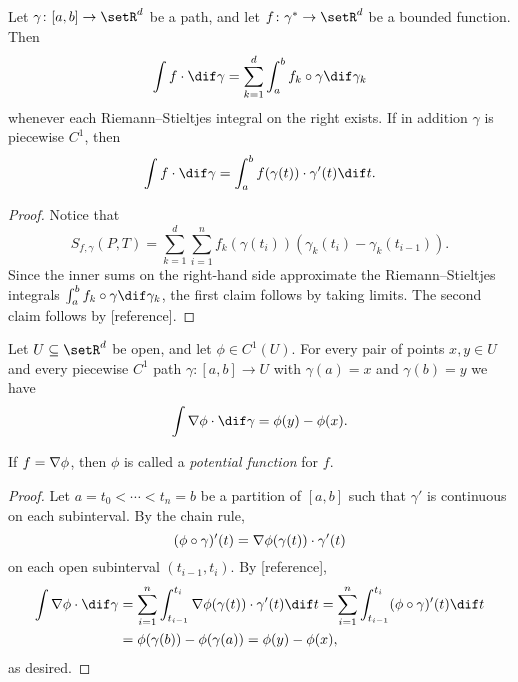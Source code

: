 \documentclass[article, a4paper, 11pt, oneside]{memoir}
\numberwithin{equation}{chapter}
\begin{document}
\begin{proposition}
	Let $\gamma \colon [a,b] \to \setR^d$ be a path, and let $f \colon \gamma^* \to \setR^d$ be a bounded function. Then
	\begin{equation*}
		\int f \cdot \dif\gamma
			= \sum_{k=1}^d \int_a^b f_k \circ \gamma \dif\gamma_k
	\end{equation*}
	whenever each Riemann--Stieltjes integral on the right exists. If in addition $\gamma$ is piecewise $C^1$, then
	\begin{equation*}
		\int f \cdot \dif\gamma
			= \int_a^b f(\gamma(t)) \cdot \gamma'(t) \dif t.
	\end{equation*}
\end{proposition}

\begin{proof}
	Notice that
	\begin{equation*}
		S_{f,\gamma}(P,T)
			= \sum_{k=1}^d \sum_{i=1}^n f_k(\gamma(t_i)) (\gamma_k(t_i) - \gamma_k(t_{i-1})).
	\end{equation*}
	Since the inner sums on the right-hand side approximate the Riemann--Stieltjes integrals $\int_a^b f_k \circ \gamma \dif\gamma_k$, the first claim follows by taking limits. The second claim follows by [reference].
\end{proof}


\begin{theorem}
	Let $U \subseteq \setR^d$ be open, and let $\phi \in C^1(U)$. For every pair of points $x,y \in U$ and every piecewise $C^1$ path $\gamma \colon [a,b] \to U$ with $\gamma(a) = x$ and $\gamma(b) = y$ we have
	\begin{equation*}
		\int \grad\phi \cdot \dif\gamma
			= \phi(y) - \phi(x).
	\end{equation*}
\end{theorem}
%
If $f = \nabla\phi$, then $\phi$ is called a \emph{potential function} for $f$.

\begin{proof}
	Let $a = t_0 < \cdots < t_n = b$ be a partition of $[a,b]$ such that $\gamma'$ is continuous on each subinterval. By the chain rule,
	\begin{equation*}
		(\phi \circ \gamma)'(t)
			= \nabla\phi(\gamma(t)) \cdot \gamma'(t)
	\end{equation*}
	on each open subinterval $(t_{i-1}, t_i)$. By [reference],
	\begin{align*}
		\int \grad\phi \cdot \dif\gamma
			&= \sum_{i=1}^n \int_{t_{i-1}}^{t_i} \grad\phi(\gamma(t)) \cdot \gamma'(t) \dif t
			= \sum_{i=1}^n \int_{t_{i-1}}^{t_i} (\phi \circ \gamma)'(t) \dif t \\
			&= \phi(\gamma(b)) - \phi(\gamma(a))
			= \phi(y) - \phi(x),
	\end{align*}
	as desired.
\end{proof}
\end{document}

